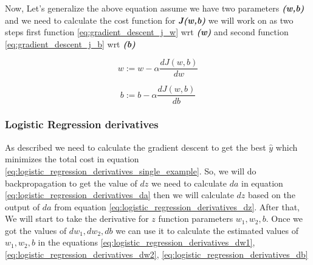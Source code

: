 Now, Let's generalize the above equation assume we have two parameters  \textbf{\textit{(w,b)}} and we need to calculate the cost function for  \textbf{\textit{J(w,b)}} we will work on as two steps first function \eqref{eq:gradient_descent_j_w}  wrt \textbf{\textit{(w)}} and second function \eqref{eq:gradient_descent_j_b} wrt \textbf{\textit{(b)}}

\begin{equation}\label{eq:gradient_descent_j_w}
      w := w - \alpha \frac{dJ(w,b)}{dw}
  \end{equation}

\begin{equation}\label{eq:gradient_descent_j_b}
      b := b - \alpha \frac{dJ(w,b)}{db}
  \end{equation}

\newpage
  \subsubsection{Logistic Regression derivatives}

  As described we need to calculate the gradient descent to get the best $\widehat{y}$ which minimizes the total cost in equation \eqref{eq:logistic_regression_derivatives_single_example}. So, we will do backpropagation to get the value of $dz$ we need to calculate $da$ in equation \eqref{eq:logistic_regression_derivatives_da} then we will calculate $dz$ based on the output of $da$ from equation \eqref{eq:logistic_regression_derivatives_dz}. After that, We will start to take the derivative for $z$ function parameters \textbf{\textit{$w_1,w_2,b$}}. Once we got the values of \textbf{\textit{$dw_1,dw_2,db$}} we can use it to calculate the estimated values of \textbf{\textit{$w_1,w_2,b$}} in the equations \eqref{eq:logistic_regression_derivatives_dw1}, \eqref{eq:logistic_regression_derivatives_dw2}, \eqref{eq:logistic_regression_derivatives_db}

